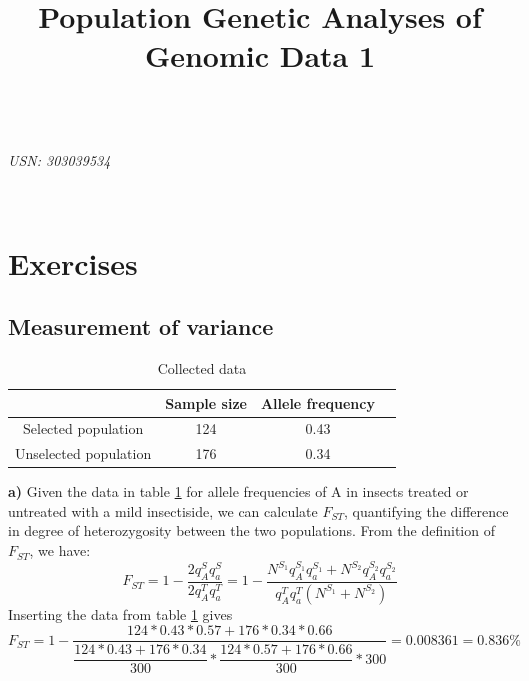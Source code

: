 \documentclass{article}
\title{Population Genetic Analyses of Genomic Data 1}
\begin{document}

\begin{center}
\textbf{\Large{}}\\
\textit{USN: 303039534}\\
\end{center}

~\\


\section{Exercises}

\subsection{Measurement of variance}

\begin{table}[h]
\centering
\begin{tabular}{ |c|c|c|c|}
\hline
 & Sample size & Allele frequency \\
\hline
Selected population & 124 & 0.43 \\
\hline
Unselected population & 176 & 0.34 \\
\hline
\end{tabular}
\caption{Collected data}
\label{tab:data}
\end{table}

\textbf{a)}
Given the data in table \ref{tab:data} for allele frequencies of A in insects treated or untreated with a mild insectiside, we can calculate $F_{ST}$, quantifying the difference in degree of heterozygosity between the two populations.
From the definition of $F_{ST}$, we have:
\begin{equation}
F_{ST} = 1 - \dfrac{2q_A^Sq_a^S}{2q_A^Tq_a^T} = 
1 - \dfrac{ N^{S_1}q_A^{S_1}q_a^{S_1} + N^{S_2}q_A^{S_2}q_a^{S_2}}{q_A^Tq_a^T(N^{S_1}+N^{S_2})}
\end{equation}
Inserting the data from table \ref{tab:data} gives
\begin{equation*}
F_{ST} = 1- \dfrac{124*0.43*0.57 + 176*0.34*0.66}{ \dfrac{124*0.43+176*0.34}{300} * \dfrac{124*0.57+176*0.66}{300}*300 }
= 0.008361 = 0.836 \%
\end{equation*}
\end{document}

